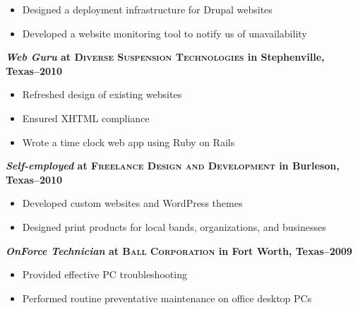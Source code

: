 \documentclass[margin]{res}
\begin{document}
\begin{resume}
\begin{itemize}
                   \item Designed a deployment infrastructure for Drupal websites
                 
                   \item Developed a website monitoring tool to notify us of unavailability
                 \end{itemize}
              
                \textbf{\textit{Web Guru}
                 at \textsc{Diverse Suspension Technologies} in Stephenville, Texas--2010}
                 \vspace{-10pt}\begin{itemize} \itemsep -2pt %
                   \item Refreshed design of existing websites
                 
                   \item Ensured XHTML compliance
                 
                   \item Wrote a time clock web app using Ruby on Rails
                 \end{itemize}
              
                \textbf{\textit{Self-employed}
                 at \textsc{Freelance Design and Development} in Burleson, Texas--2010}
                 \vspace{-10pt}\begin{itemize} \itemsep -2pt %
                   \item Developed custom websites and WordPress themes
                 
                   \item Designed print products for local bands, organizations, and businesses
                 \end{itemize}
              
                \textbf{\textit{OnForce Technician}
                 at \textsc{Ball Corporation} in Fort Worth, Texas--2009}
                 \vspace{-10pt}\begin{itemize} \itemsep -2pt %
                   \item Provided effective PC troubleshooting
                 
                   \item Performed routine preventative maintenance on office desktop PCs
                 \end{itemize}
              


\end{resume}
\end{document}
